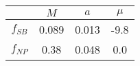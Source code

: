 \begin{tabular}{c||c|c|c}
 & $M$ & $a$ & $\mu$  \\
\hline
$f_{SB}$  & 0.089 & 0.013 & -9.8\\
$f_{NP}$  & 0.38 & 0.048 & 0.0\\
\end{tabular}
